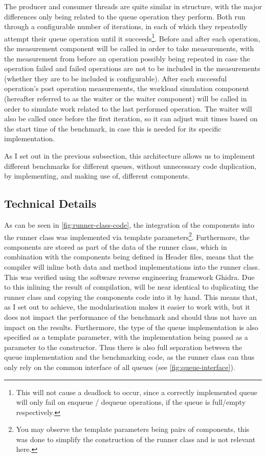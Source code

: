 The producer and consumer threads are quite similar in structure, with the major differences only being
related to the queue operation they perform.
Both run through a configurable number of iterations, in each of which they repeatedly attempt their queue operation
until it succeeds\footnote{This will not cause a deadlock to occur, since a correctly implemented queue will
only fail on enqueue / dequeue operations, if the queue is full/empty respectively.}.
Before and after each operation, the measurement component will be called in order to take measurements, with
the measurement from before an operation possibly being repeated in case the operation failed and failed
operations are not to be included in the measurements (whether they are to be included is configurable).
After each successful operation's post operation measurements, the workload simulation component (hereafter
referred to as the waiter or the waiter component) will be called in order to simulate work related
to the last performed operation.
The waiter will also be called once before the first iteration, so it can adjust wait times based on the
start time of the benchmark, in case this is needed for its specific implementation.

As I set out in the previous subsection, this architecture allows us to implement different benchmarks for
different queues, without unnecessary code duplication, by implementing, and making use of, different components.

\subsection{Technical Details}
\label{sec:framework-technical-details}



As can be seen in \autoref{fig:runner-class-code}, the integration of the components into the runner class
was implemented via template parameters\footnote{You may observe the template parameters being pairs of
components, this was done to simplify the construction of the runner class and is not relevant here.}.
Furthermore, the components are stored as part of the data of the runner class, which in combination with the
components being defined in Header files, means that the compiler will inline both data and method
implementations into the runner class.
This was verified using the software reverse engineering framework Ghidra.
Due to this inlining the result of compilation, will be near identical to duplicating the runner class and
copying the components code into it by hand.
This means that, as I set out to achieve, the modularisation makes it easier to work with, but it does not
impact the performance of the benchmark and should thus not have an impact on the results.
Furthermore, the type of the queue implementation is also specified as a template parameter, with the
implementation being passed as a parameter to the constructor.
Thus there is also full separation between the queue implementation and the benchmarking code, as the runner
class can thus only rely on the common interface of all queues (see \autoref{fig:queue-interface}).

